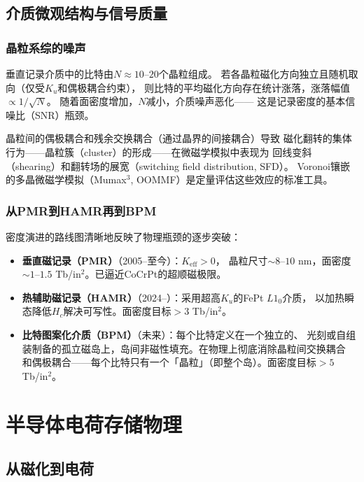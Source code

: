 \documentclass[11pt,a4paper,openany]{book}
\theoremstyle{definition}
\theoremstyle{plain}
\theoremstyle{remark}
\begin{document}
\section{介质微观结构与信号质量}

\subsection{晶粒系综的噪声}

垂直记录介质中的比特由$N \approx 10$--$20$个晶粒组成。
若各晶粒磁化方向独立且随机取向（仅受$K_u$和偶极耦合约束），
则比特的平均磁化方向存在统计涨落，涨落幅值$\propto 1/\sqrt{N}$。
随着面密度增加，$N$减小，介质噪声恶化——
这是记录密度的基本信噪比（SNR）瓶颈。

晶粒间的偶极耦合和残余交换耦合（通过晶界的间接耦合）导致
磁化翻转的集体行为——晶粒簇（cluster）的形成——在微磁学模拟中表现为
回线变斜（shearing）和翻转场的展宽（switching field distribution, SFD）。
Voronoi镶嵌的多晶微磁学模拟（Mumax$^3$, OOMMF）是定量评估这些效应的标准工具。

\subsection{从PMR到HAMR再到BPM}

密度演进的路线图清晰地反映了物理瓶颈的逐步突破：
\begin{itemize}
  \item \textbf{垂直磁记录（PMR）}（2005--至今）：$K_{\text{eff}} > 0$，
  晶粒尺寸$\sim 8$--$10$ nm，面密度$\sim 1$--$1.5$ Tb/in$^2$。已逼近CoCrPt的超顺磁极限。
  \item \textbf{热辅助磁记录（HAMR）}（2024--）：采用超高$K_u$的FePt $L1_0$介质，
  以加热瞬态降低$H_c$解决可写性。面密度目标$> 3$ Tb/in$^2$。
  \item \textbf{比特图案化介质（BPM）}（未来）：每个比特定义在一个独立的、
  光刻或自组装制备的孤立磁岛上，岛间非磁性填充。在物理上彻底消除晶粒间交换耦合
  和偶极耦合——每个比特只有一个「晶粒」（即整个岛）。面密度目标$> 5$ Tb/in$^2$。
\end{itemize}

\chapter{半导体电荷存储物理}
\label{ch:nand}

\section{从磁化到电荷}
\end{document}
